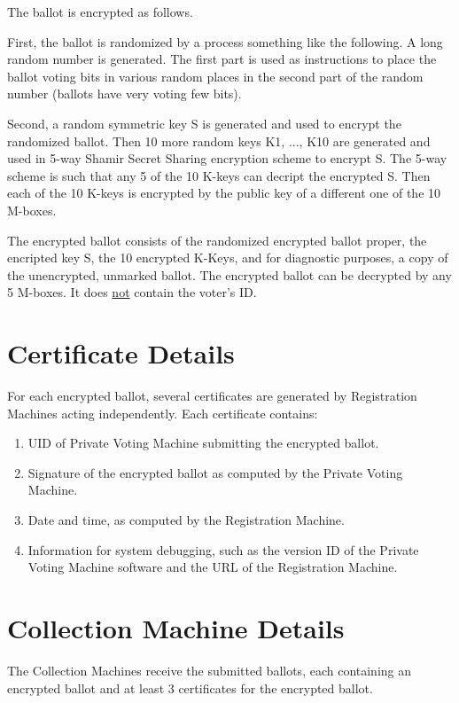 \documentclass[12pt]{article}
\begin{document}
The ballot is encrypted as follows.

First, the ballot is randomized by a process something like
the following.  A long random number is generated.  The first
part is used as instructions to place the ballot voting bits in
various random places in the second part of the random number
(ballots have very voting few bits).

Second, a random symmetric key S is generated and used to encrypt
the randomized ballot.  Then 10 more random keys K1, ..., K10 are generated
and used in 5-way Shamir Secret Sharing encryption
scheme to encrypt S.  The 5-way
scheme is such that any 5 of the 10 K-keys can decript the encrypted S.
Then each of the 10 K-keys is encrypted by the public key
of a different one of the 10 M-boxes.

The encrypted ballot consists of the randomized encrypted ballot proper,
the encripted key S, the 10 encrypted K-Keys, and for
diagnostic purposes, a copy of the unencrypted, unmarked ballot.  The
encrypted ballot can be decrypted
by any 5 M-boxes.  It does \underline{not} contain the voter's ID.

\section{Certificate Details}

For each encrypted ballot, several certificates are generated
by Registration Machines acting independently.  Each certificate
contains:
\begin{enumerate}
\item UID of Private Voting Machine submitting the encrypted ballot.
\item Signature of the encrypted ballot as computed by the
      Private Voting Machine.
\item Date and time, as computed by the Registration Machine.
\item Information for system debugging, such as the version ID of the
      Private Voting Machine software and the URL of the Registration
      Machine.
\end{enumerate}

\section{Collection Machine Details}

The Collection Machines receive the submitted ballots, each containing
an encrypted ballot and at least 3 certificates for the encrypted
ballot.
\end{document}

